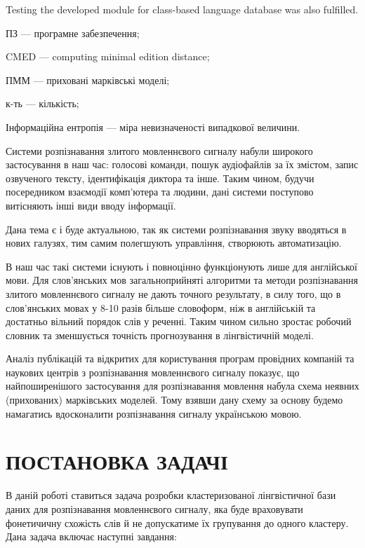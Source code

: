 \documentclass{diploma}
\begin{document}
Testing the developed module for class-based language database was also fulfilled.	
\newpage

\maketitlepage
  	
\shortings
	
ПЗ --- програмне забезпечення;

CMED --- computing minimal edition distance;

ПММ ---  приховані марківські моделі;

к-ть --- кількість;

Інформаційна ентропія --- міра невизначеності випадкової величини.



\intro Системи розпізнавання злитого мовленнєвого сигналу набули широкого застосування в наш час: голосові команди, пошук аудіофайлів за їх змістом, запис озвученого тексту, ідентифікація диктора та інше. Таким чином, будучи посередником взаємодії комп'ютера та людини, дані системи поступово витісняють інші види вводу інформації.

Дана тема є і буде актуальною, так як системи розпізнавання звуку вводяться в нових галузях, тим самим полегшують управління, створюють автоматизацію. 

В наш час такі системи існують і повноцінно функціонують лише для англійської мови. Для слов'янських мов загальноприйняті алгоритми  та методи розпізнавання злитого мовленнєвого сигналу не дають точного результату, в силу того, що в слов'янських мовах у 8-10 разів більше словоформ, ніж в англійській та достатньо вільний порядок слів у реченні. Таким чином сильно зростає робочий словник та зменшується точність прогнозування в лінгвістичній моделі.

Аналіз публікацій та відкритих для користування програм провідних компаній та наукових центрів з розпізнавання мовленнєвого сигналу показує, що найпоширенішого застосування для розпізнавання мовлення набула схема неявних (прихованих) марківських моделей. Тому взявши дану схему за основу будемо намагатись вдосконалити розпізнавання сигналу українською мовою.


\newpage





\chapter{ПОСТАНОВКА ЗАДАЧІ}

В даній роботі ставиться задача розробки кластеризованої лінгвістичної бази даних для розпізнавання мовленнєвого сигналу, яка буде враховувати фонетичичну схожість слів й не допускатиме їх групування до одного кластеру. Дана задача включає наступні завдання:
\end{document}
